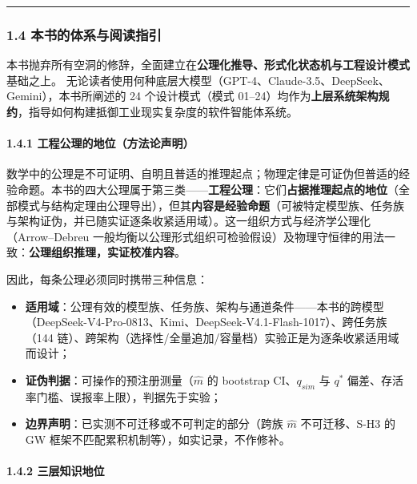 \documentclass[
]{ctexart}
\providecommand{\tightlist}{%
  \setlength{\itemsep}{0pt}\setlength{\parskip}{0pt}}
\renewcommand{\_}{\discretionary{}{}{\textunderscore}}
\begin{document}
\begin{center}\rule{0.5\linewidth}{0.5pt}\end{center}

\subsubsection{1.4
本书的体系与阅读指引}\label{ux672cux4e66ux7684ux4f53ux7cfbux4e0eux9605ux8bfbux6307ux5f15}

本书抛弃所有空洞的修辞，全面建立在\textbf{公理化推导、形式化状态机与工程设计模式}基础之上。
无论读者使用何种底层大模型（GPT-4、Claude-3.5、DeepSeek、Gemini），本书所阐述的
24 个设计模式（模式
01--24）均作为\textbf{上层系统架构规约}，指导如何构建抵御工业现实复杂度的软件智能体系统。

\paragraph{1.4.1
工程公理的地位（方法论声明）}\label{ux5de5ux7a0bux516cux7406ux7684ux5730ux4f4dux65b9ux6cd5ux8bbaux58f0ux660e}

数学中的公理是不可证明、自明且普适的推理起点；物理定律是可证伪但普适的经验命题。本书的四大公理属于第三类------\textbf{工程公理}：它们\textbf{占据推理起点的地位}（全部模式与结构定理由公理导出），但其\textbf{内容是经验命题}（可被特定模型族、任务族与架构证伪，并已随实证逐条收紧适用域）。这一组织方式与经济学公理化（Arrow--Debreu
一般均衡以公理形式组织可检验假设）及物理守恒律的用法一致：\textbf{公理组织推理，实证校准内容}。

因此，每条公理必须同时携带三种信息：

\begin{itemize}
\tightlist
\item
  \textbf{适用域}：公理有效的模型族、任务族、架构与通道条件------本书的跨模型（DeepSeek-V4-Pro-0813、Kimi、DeepSeek-V4.1-Flash-1017）、跨任务族（144
  链）、跨架构（选择性/全量追加/容量档）实验正是为逐条收紧适用域而设计；
\item
  \textbf{证伪判据}：可操作的预注册测量（\(\hat m\) 的 bootstrap
  CI、\(q_{sim}\) 与 \(q^*\)
  偏差、存活率门槛、误报率上限），判据先于实验；
\item
  \textbf{边界声明}：已实测不可迁移或不可判定的部分（跨族 \(\hat m\)
  不可迁移、S-H3 的 GW 框架不匹配累积机制等），如实记录，不作修补。
\end{itemize}

\paragraph{1.4.2
三层知识地位}\label{ux4e09ux5c42ux77e5ux8bc6ux5730ux4f4d}
\end{document}
